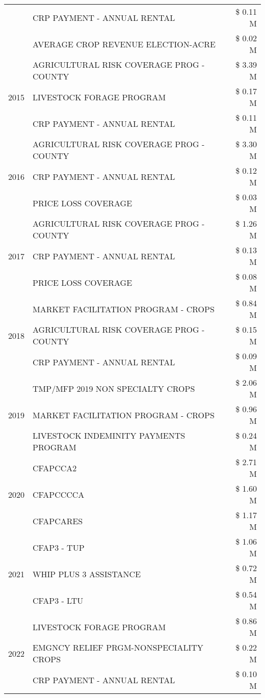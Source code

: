 \begin{tabular}{llr}
 & CRP PAYMENT - ANNUAL RENTAL & \$ 0.11 M \\
 & AVERAGE CROP REVENUE ELECTION-ACRE & \$ 0.02 M \\
\cline{1-3}
\multirow[t]{3}{*}{2015} & AGRICULTURAL RISK COVERAGE PROG - COUNTY & \$ 3.39 M \\
 & LIVESTOCK FORAGE PROGRAM & \$ 0.17 M \\
 & CRP PAYMENT - ANNUAL RENTAL & \$ 0.11 M \\
\cline{1-3}
\multirow[t]{3}{*}{2016} & AGRICULTURAL RISK COVERAGE PROG - COUNTY & \$ 3.30 M \\
 & CRP PAYMENT - ANNUAL RENTAL & \$ 0.12 M \\
 & PRICE LOSS COVERAGE & \$ 0.03 M \\
\cline{1-3}
\multirow[t]{3}{*}{2017} & AGRICULTURAL RISK COVERAGE PROG - COUNTY & \$ 1.26 M \\
 & CRP PAYMENT - ANNUAL RENTAL & \$ 0.13 M \\
 & PRICE LOSS COVERAGE & \$ 0.08 M \\
\cline{1-3}
\multirow[t]{3}{*}{2018} & MARKET FACILITATION PROGRAM - CROPS & \$ 0.84 M \\
 & AGRICULTURAL RISK COVERAGE PROG - COUNTY & \$ 0.15 M \\
 & CRP PAYMENT - ANNUAL RENTAL & \$ 0.09 M \\
\cline{1-3}
\multirow[t]{3}{*}{2019} & TMP/MFP 2019 NON SPECIALTY CROPS & \$ 2.06 M \\
 & MARKET FACILITATION PROGRAM - CROPS & \$ 0.96 M \\
 & LIVESTOCK INDEMINITY PAYMENTS PROGRAM & \$ 0.24 M \\
\cline{1-3}
\multirow[t]{3}{*}{2020} & CFAPCCA2 & \$ 2.71 M \\
 & CFAPCCCCA & \$ 1.60 M \\
 & CFAPCARES & \$ 1.17 M \\
\cline{1-3}
\multirow[t]{3}{*}{2021} & CFAP3 - TUP & \$ 1.06 M \\
 & WHIP PLUS 3 ASSISTANCE & \$ 0.72 M \\
 & CFAP3 - LTU & \$ 0.54 M \\
\cline{1-3}
\multirow[t]{3}{*}{2022} & LIVESTOCK FORAGE PROGRAM & \$ 0.86 M \\
 & EMGNCY RELIEF PRGM-NONSPECIALITY CROPS & \$ 0.22 M \\
 & CRP PAYMENT - ANNUAL RENTAL & \$ 0.10 M \\
\cline{1-3}
\bottomrule
\end{tabular}
